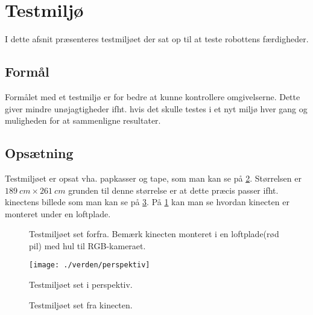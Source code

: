 \section{Testmiljø}
I dette afsnit præsenteres testmiljøet der sat op til at teste robottens færdigheder.

\subsection{Formål}
Formålet med et testmiljø er for bedre at kunne kontrollere omgivelserne.
Dette giver mindre unøjagtigheder ifht. hvis det skulle testes i et nyt miljø hver gang og muligheden for at sammenligne resultater.

\subsection{Opsætning}
Testmiljøet er opsat vha. papkasser og tape, som man kan se på \cref{testmiljo:perspektiv}.
Størrelsen er $189 \ cm \times 261 \ cm$ grunden til denne størrelse er at dette præcis passer ifht. kinectens billede som man kan se på \cref{testmiljo:oppefra}.
På \cref{testmiljo:forfra} kan man se hvordan kinecten er monteret under en loftplade.

\begin{figure}
\caption{Testmiljøet set forfra. Bemærk kinecten monteret i en loftplade(rød pil) med hul til RGB-kameraet.}
\label{testmiljo:forfra}
\end{figure}

\begin{figure}
\texttt{[image: ./verden/perspektiv]}
\caption{Testmiljøet set i perspektiv.}
\label{testmiljo:perspektiv}
\end{figure}

\begin{figure}
\caption{Testmiljøet set fra kinecten.}
\label{testmiljo:oppefra}
\end{figure}